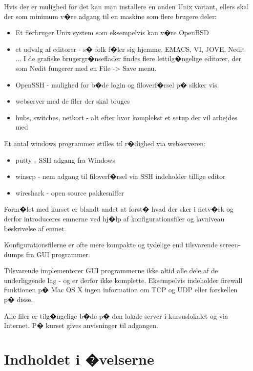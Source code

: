 \documentclass[a4paper,11pt,notitlepage]{oevelser}
\begin{document}
Hvis der er mulighed for det kan man installere en anden Unix variant,
ellers skal der som minimum v�re adgang til en
maskine som flere brugere deler:
\begin{itemize}
\item Et flerbruger Unix system som eksempelvis kan v�re OpenBSD
\item et udvalg af editorer - s� folk f�ler sig hjemme, EMACS, VI,
  JOVE, Nedit ... I de grafiske brugergr�nseflader findes flere
  lettilg�ngelige  editorer, der som Nedit fungerer med en File ->
  Save menu.
\item OpenSSH - mulighed for b�de login og filoverf�rsel p� sikker vis.
\item webserver med de filer der skal bruges
\item hubs, switches, netkort - alt efter hvor komplekst et setup der
  vil arbejdes med
\end{itemize}

Et antal windows programmer stilles til r�dighed via webserveren:
\begin{itemize}
\item putty - SSH adgang fra Windows
\item winscp - nem adgang til filoverf�rsel via SSH indeholder tillige editor
\item wireshark - open source pakkesniffer
\end{itemize}


Form�let med kurset er blandt andet at forst� hvad der sker i netv�rk
og derfor introduceres emnerne ved hj�lp af konfigurationsfiler og
lavniveau beskrivelse af emnet.

Konfigurationsfilerne er ofte mere kompakte og tydelige end
tilsvarende screen-dumps fra GUI programmer.

Tilsvarende implementerer GUI programmerne ikke altid alle dele af de
underliggende lag - og er derfor ikke komplette. Eksempelvis
indeholder firewall funktionen p� Mac OS X ingen information om TCP og
UDP eller forskellen p� disse.


Alle filer er tilg�ngelige b�de p� den lokale server i kursuslokalet
og via Internet. P� kurset gives anvisninger til adgangen.





\chapter*{\color{titlecolor}Indholdet i �velserne}
\end{document}
